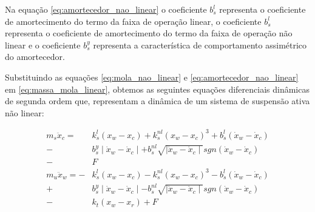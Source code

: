 \documentclass[a4paper]{ifacconf}
\begin{document}
    Na equação \ref{eq:amortecedor_nao_linear} o coeficiente $b^{l}_{s}$ representa o coeficiente de amortecimento do termo da faixa de operação linear, o coeficiente $b^{l}_{s}$ representa o coeficiente de amortecimento do termo da faixa de operação não linear e o coeficiente $b^{y}_{s}$ representa a característica de comportamento assimétrico do amortecedor.
    
    Substituindo as equações \ref{eq:mola_nao_linear} e \ref{eq:amortecedor_nao_linear} em \ref{eq:massa_mola_linear}, obtemos as seguintes equações diferenciais dinâmicas de segunda ordem que, representam a dinâmica de um sistema de suspensão ativa não linear:
    
    \begin{equation} \label{eq:massa_mola_nao_linear}
        \begin{aligned}
         m_{s} \ddot{x}_{c} =\ \ &k^{l}_{s}(x_{w}-x_{c})+k^{nl}_{s}(x_{w}-x_{c})^{3}+b^{l}_{s}(\dot{x}_{w}-\dot{x}_{c})\\
                            -&b^{y}_{s}\mid\dot{x}_{w}-\dot{x}_{c}\mid+b^{nl}_{s}\sqrt{\mid\dot{x}_{w}-\dot{x}_{c}\mid}sgn(\dot{x}_{w}-\dot{x}_{c})\\ 
                            -&F\\
         m_{u} \ddot{x}_{w} = -&k^{l}_{s}(x_{w}-x_{c})-k^{nl}_{s}(x_{w}-x_{c})^{3}-b^{l}_{s}(\dot{x}_{w}-\dot{x}_{c})\\  
                            +&b^{y}_{s}\mid\dot{x}_{w}-\dot{x}_{c}\mid-b^{nl}_{s}\sqrt{\mid\dot{x}_{w}-\dot{x}_{c}\mid}sgn(\dot{x}_{w}-\dot{x}_{c})\\
                            -&k_{t}(x_{w}-x_{r})+F\\
        \end{aligned}
    \end{equation}
\end{document}
